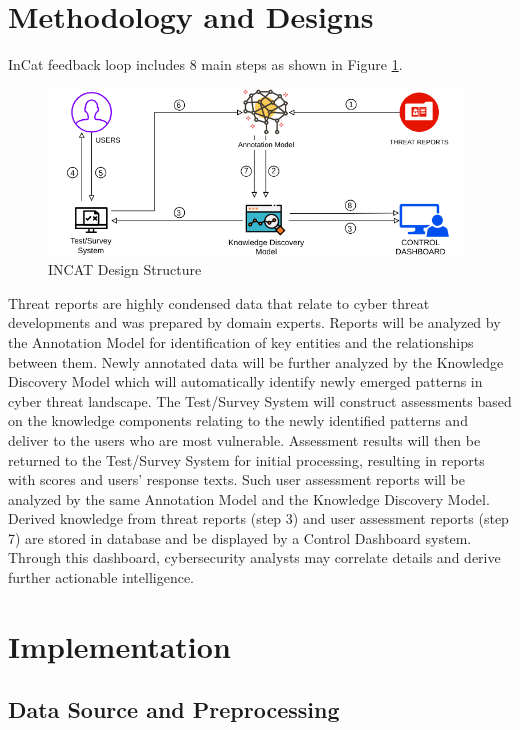 \documentclass{article} %
\begin{document}
\section{Methodology and Designs}
InCat feedback loop includes 8 main steps as shown in Figure \ref{Figure:IncatDesign}. 

\begin{figure}[h]
  \centering
  \includegraphics[width=11cm]{images/INCAT-Designs.png}
  \caption{INCAT Design Structure}
  \label{Figure:IncatDesign}
\end{figure}

Threat reports are highly condensed data that relate to cyber threat developments and was prepared by domain experts. Reports will be analyzed by the Annotation Model for identification of key entities and the relationships between them. Newly annotated data will be further analyzed by the Knowledge Discovery Model which will automatically identify newly emerged patterns in cyber threat landscape. The Test/Survey System will construct assessments based on the knowledge components relating to the newly identified patterns and deliver to the users who are most vulnerable. Assessment results will then be returned to the Test/Survey System for initial processing, resulting in reports with scores and users' response texts. Such user assessment reports will be analyzed by the same Annotation Model and the Knowledge Discovery Model. Derived knowledge from threat reports (step 3) and user assessment reports (step 7) are stored in database and be displayed by a Control Dashboard system. Through this dashboard, cybersecurity analysts may correlate details and derive further actionable intelligence.

\section{Implementation}
\subsection{Data Source and Preprocessing}
\end{document}
